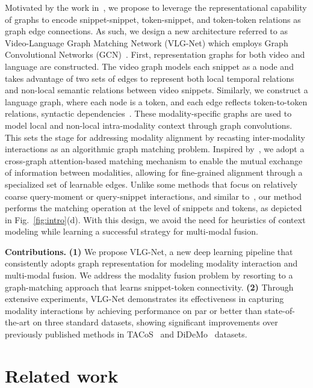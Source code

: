 \documentclass[10pt,twocolumn,letterpaper]{article}
\begin{document}
Motivated by the work in~\cite{Xu_2020_CVPR}, we propose to leverage the representational capability of graphs to encode snippet-snippet, token-snippet, and token-token relations as graph edge connections.
As such, we design a new architecture referred to as Video-Language Graph Matching Network (VLG-Net)
which employs Graph Convolutional Networks (GCN)~\cite{kipf2016semi}. 
First, representation graphs for both video and language are constructed. The video graph models each snippet as a node and takes advantage of two sets of edges to represent both local temporal relations and non-local semantic relations between video snippets. Similarly, we construct a language graph, where each node is a token, and each edge reflects token-to-token relations, \eg syntactic dependencies~\cite{manning2014stanford, marcheggiani_titov_2017_encoding}. These modality-specific graphs are used to model local and non-local intra-modality context through graph convolutions. This sets the stage for addressing modality alignment by recasting inter-modality interactions as an algorithmic graph matching problem. Inspired by~\cite{li2019graph, xu2019cross}, we adopt a cross-graph attention-based matching mechanism to enable the mutual exchange of information between modalities, allowing for fine-grained alignment through a specialized set of learnable edges. Unlike some methods that focus on relatively coarse query-moment or query-snippet interactions, and similar to~\cite{chen2018temporally, zhang2019cross}, our method performs the matching operation at the level of snippets and tokens, as depicted in Fig.~\ref{fig:intro}(d). 
With this design, we avoid the need for heuristics of context modeling while learning a successful strategy for multi-modal fusion.

\noindent\textbf{Contributions.} 
\textbf{(1)} We propose VLG-Net, a new deep learning pipeline that consistently adopts graph representation for modeling modality interaction and multi-modal fusion. We address the modality fusion problem by resorting to a graph-matching approach that learns snippet-token connectivity. 
\textbf{(2)} Through extensive experiments, VLG-Net demonstrates its effectiveness in capturing modality interactions by achieving performance on par or better than state-of-the-art on three standard datasets, showing significant improvements over previously published methods in TACoS~\cite{TACoS_ACL_2013} and DiDeMo~\cite{Hendricks_2017_ICCV} datasets. 

 \section{Related work}\label{sec: related}
\end{document}
